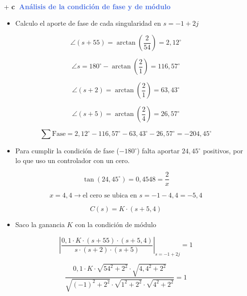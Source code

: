 \documentclass[10pt]{article}
\begin{document}
\vspace{0.4cm}

 + {\Large\textbf{\textcircled{\normalsize c}}}\hspace{0.2cm} \textbf{\textcolor{RoyalBlue}{Análisis de la condición de fase y de módulo}}

\begin{itemize}
    \item Calculo el aporte de fase de cada singularidad en $s = -1 + 2j$
\end{itemize}

\[
\angle (s + 55) = \arctan\left(\frac{2}{54}\right) = 2{,}12^{\circ}
\]

\[
\angle s = 180^{\circ} - \arctan\left(\frac{2}{1}\right) = 116{,}57^{\circ}
\]

\[
\angle (s + 2) = \arctan\left(\frac{2}{1}\right) = 63{,}43^{\circ}
\]

\[
\angle (s + 5) = \arctan\left(\frac{2}{4}\right) = 26{,}57^{\circ}
\]

\[
\sum \text{Fase} = 2{,}12^{\circ} - 116{,}57^{\circ} - 63{,}43^{\circ} - 26{,}57^{\circ} = -204{,}45^{\circ}
\]

\begin{itemize}
    \item Para cumplir la condición de fase ($-180^{\circ}$) falta aportar $24{,}45^{\circ}$ positivos, por lo que uso un controlador con un cero.
\end{itemize}

\[
\tan(24{,}45^{\circ}) = 0{,}4548 = \frac{2}{x}
\]

\[
x = 4{,}4 \longrightarrow \text{el cero se ubica en } s = -1 - 4{,}4 = -5{,}4
\]

\[
C(s) = K \cdot (s + 5{,}4)
\]



\begin{itemize}
    \item Saco la ganancia $K$ con la condición de módulo
\end{itemize}

\[
\left| \frac{0{,}1 \cdot K \cdot (s + 55) \cdot (s + 5{,}4)}{s \cdot (s + 2) \cdot (s + 5)} \right|_{s = -1 + 2j} = 1
\]

\[
\frac{0{,}1 \cdot K \cdot \sqrt{54^2 + 2^2} \cdot \sqrt{4{,}4^2 + 2^2}}{\sqrt{(-1)^2 + 2^2} \cdot \sqrt{1^2 + 2^2} \cdot \sqrt{4^2 + 2^2}} = 1
\]
\end{document}
